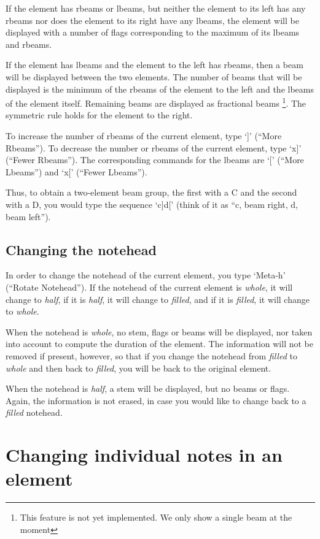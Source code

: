 \documentclass[11pt]{book}
\def\unimp#1{\footnote{This feature is not yet implemented.  #1}}
\def\kbd#1{`#1'}
\def\command#1{``#1''}
\begin{document}
If the element has rbeams or lbeams, but neither the element to its
left has any rbeams nor does the element to its right have any lbeams,
the element will be displayed with a number of flags corresponding to
the maximum of its lbeams and rbeams.

If the element has lbeams and the element to the left has rbeams, then
a beam will be displayed between the two elements.  The number of
beams that will be displayed is the minimum of the rbeams of the
element to the left and the lbeams of the element itself.  Remaining
beams are displayed as fractional beams \unimp{We only show a single
  beam at the moment}.  The symmetric rule holds for the element to
the right. 

To increase the number of rbeams of the current element, type \kbd{]}
  (\command{More Rbeams}).  To decrease the number or rbeams of the
  current element, type \kbd{x]} (\command{Fewer Rbeams}).  The
  corresponding commands for the lbeams are \kbd{[} (\command{More
  Lbeams}) and \kbd{x[} (\command{Fewer Lbeams}). 

Thus, to obtain a two-element beam group, the first with a C and the
second with a D, you would type the sequence \kbd{c]d[} (think of it
as ``c, beam right, d, beam left'').  

\section{Changing the notehead}

In order to change the notehead of the current element, you type
\kbd{Meta-h} (\command{Rotate Notehead}).  If the notehead of the current
element is \emph{whole}, it will change to \emph{half}, if it is
\emph{half}, it will change to \emph{filled}, and if it is
\emph{filled}, it will change to \emph{whole}.  

When the notehead is \emph{whole}, no stem, flags or beams will be
displayed, nor taken into account to compute the duration of the
element.  The information will not be removed if present, however, so
that if you change the notehead from \emph{filled} to \emph{whole} and
then back to \emph{filled}, you will be back to the original element. 

When the notehead is \emph{half}, a stem will be displayed, but no
beams or flags.  Again, the information is not erased, in case you
would like to change back to a \emph{filled} notehead. 

\chapter{Changing individual notes in an element}
\end{document}
